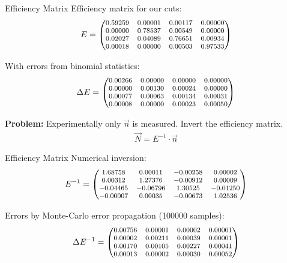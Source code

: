 \documentclass[11pt,xcolor=dvipsnames,professionalfonts]{beamer}
\begin{document}
\begin{frame}{Efficiency Matrix}
	Efficiency matrix for our cuts:
	\begin{align*}
	\footnotesize
	E = \begin{pmatrix}
	0.59259 & 0.00001 & 0.00117 & 0.00000 \\
	0.00000 & 0.78537 & 0.00549 & 0.00000 \\
	0.02027 & 0.04089 & 0.76651 & 0.00934 \\
	0.00018 & 0.00000 & 0.00503 & 0.97533 \\
	\end{pmatrix}
	\end{align*}
	
	With errors from binomial statistics:
	\begin{align*}
	\footnotesize
	\Delta E = \begin{pmatrix}
	0.00266 & 0.00000 & 0.00000 & 0.00000 \\
	0.00000 & 0.00130 & 0.00024 & 0.00000 \\
	0.00077 & 0.00063 & 0.00134 & 0.00031 \\
	0.00008 & 0.00000 & 0.00023 & 0.00050 \\
	\end{pmatrix}
	\end{align*}
	
	\pause
	
	\vspace{0.5cm}
	
	\textbf{Problem:} Experimentally only $\vec{n}$ is measured. Invert the efficiency matrix.
	\begin{align*}
		\vec{N} = E^{-1} \cdot \vec{n}
	\end{align*}
\end{frame}

\begin{frame}{Efficiency Matrix}
	Numerical inversion:
	\begin{align*}
	\footnotesize
	E^{-1} = \begin{pmatrix}
	1.68758 & 0.00011 &-0.00258 & 0.00002 \\
	0.00312 & 1.27376 &-0.00912 & 0.00009 \\
	-0.04465 &-0.06796 & 1.30525 &-0.01250 \\
	-0.00007 & 0.00035 &-0.00673 & 1.02536 \\
	\end{pmatrix}
	\end{align*}
	
	\vfill
	
	Errors by Monte-Carlo error propagation (\num{100000} samples):
	\begin{align*}
	\footnotesize
	\Delta E^{-1} = \begin{pmatrix}
	0.00756 & 0.00001 & 0.00002 & 0.00001 \\
	0.00002 & 0.00211 & 0.00039 & 0.00001 \\
	0.00170 & 0.00105 & 0.00227 & 0.00041 \\
	0.00013 & 0.00002 & 0.00030 & 0.00052 \\
	\end{pmatrix}
	\end{align*}
\end{frame}
\end{document}

